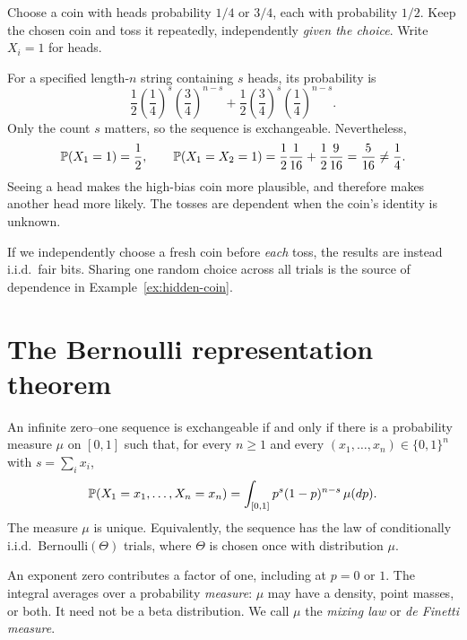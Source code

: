 \begin{example}\label{ex:hidden-coin}
Choose a coin with heads probability $1/4$ or $3/4$, each with probability $1/2$. Keep the chosen coin and toss it repeatedly, independently \emph{given the choice}. Write $X_i=1$ for heads.

For a specified length-$n$ string containing $s$ heads, its probability is
\[
\frac12\left(\frac14\right)^s\left(\frac34\right)^{n-s}
+\frac12\left(\frac34\right)^s\left(\frac14\right)^{n-s}.
\]
Only the count $s$ matters, so the sequence is exchangeable. Nevertheless,
\[
\P(X_1=1)=\frac12,\qquad
\P(X_1=X_2=1)=\frac12\frac1{16}+\frac12\frac9{16}
=\frac5{16}\ne\frac14.
\]
Seeing a head makes the high-bias coin more plausible, and therefore makes another head more likely. The tosses are dependent when the coin's identity is unknown.
\end{example}

\begin{checkpoint}
If we independently choose a fresh coin before \emph{each} toss, the results are instead i.i.d.\ fair bits. Sharing one random choice across all trials is the source of dependence in Example~\ref{ex:hidden-coin}.
\end{checkpoint}

\section{The Bernoulli representation theorem}

\begin{theorem}\label{thm:df}
An infinite zero--one sequence is exchangeable if and only if there is a probability measure $\mu$ on $[0,1]$ such that, for every $n\ge1$ and every $(x_1,\ldots,x_n)\in\{0,1\}^n$ with $s=\sum_i x_i$,
\begin{equation}\label{eq:df}
\P(X_1=x_1,\ldots,X_n=x_n)
=\int_{[0,1]} p^s(1-p)^{n-s}\,\mu(dp).
\end{equation}
The measure $\mu$ is unique. Equivalently, the sequence has the law of conditionally i.i.d.\ Bernoulli$(\Theta)$ trials, where $\Theta$ is chosen once with distribution $\mu$.
\end{theorem}

An exponent zero contributes a factor of one, including at $p=0$ or $1$. The integral averages over a probability \emph{measure}: $\mu$ may have a density, point masses, or both. It need not be a beta distribution. We call $\mu$ the \emph{mixing law} or \emph{de Finetti measure}.

